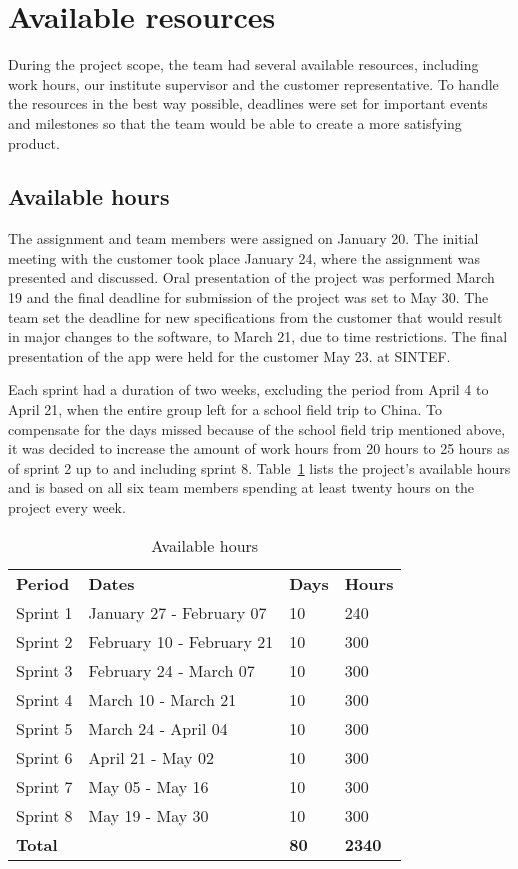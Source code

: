 \newpage
\section{Available resources}
\label{sec:availResources}
During the project scope, the team had several available resources, including work hours, our institute supervisor and the customer representative. To handle the resources in the best way possible, deadlines were set for important events and milestones so that the team would be able to create a more satisfying product.


\subsection{Available hours}
The assignment and team members were assigned on January 20. The initial meeting with the customer took place January 24, where the assignment was presented and discussed. Oral presentation of the project was performed March 19 and the final deadline for submission of the project was set to May 30. The team set the deadline for new specifications from the customer that would result in major changes to the software, to March 21, due to time restrictions. The final presentation of the app were held for the customer May 23. at SINTEF.

Each sprint had a duration of two weeks, excluding the period from April 4 to April 21, when the entire group left for a school field trip to China. To compensate for the days missed because of the school field trip mentioned above, it was decided to increase the amount of work hours from 20 hours to 25 hours as of sprint 2 up to and including sprint 8. Table~\ref{tab:availHours} lists the project's available hours and is based on all six team members spending at least twenty hours on the project every week.


\begin{table}[H]
\centering
{}
\begin{tabular}{|l|l|l|l|}
\hline
\textbf{Period} & \textbf{Dates} & \textbf{Days} & \textbf{Hours}\\
Sprint 1& January 27 - February 07 & 10  & 240 \\
Sprint 2 & February 10 - February 21 &10  & 300 \\
Sprint 3 & February 24 - March 07 &10 & 300 \\
Sprint 4 & March 10 - March 21 &10  &300 \\
Sprint 5 & March 24 - April 04 &10&  300 \\
Sprint 6 & April 21 - May 02 &10  &300 \\
Sprint 7 & May 05 - May 16 &10  &300 \\
Sprint 8 & May 19 - May 30 &10  &300 \\
\textbf{Total}&& \textbf{80}&  \textbf{2340}\\\hline
\end{tabular}
\caption{Available hours}
\label{tab:availHours}
\end{table}


